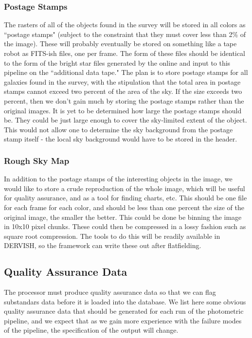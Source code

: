 \subsubsection{Postage Stamps}

The rasters of all of the objects found in the survey will be stored in 
all colors as ``postage stamps" (subject to the constraint that they
must cover less than 2\% of the image).  These will probably eventually be 
stored on something like a tape robot as FITS-ish files, one per frame.  
The form of these files should be identical to the form of the bright 
star files generated by the online and input to this pipeline on 
the ``additional data tape."  The plan is to
store postage stamps for all galaxies found in the survey, with the stipulation
that the total area in postage stamps cannot exceed two percent of the area
of the sky.  If the size exceeds two percent, then we don't gain much by
storing the postage stamps rather than the original images.  It is yet to
be determined how large the postage stamps should be.  They could be just
large enough to cover the sky-limited extent of the object.  This would not
allow one to determine the sky background from the postage stamp itself -
the local sky background would have to be stored in the header.

\subsubsection{Rough Sky Map}

In addition to the postage stamps of the interesting objects in the image,
we would like to store a crude reproduction of the whole image, which will
be useful for quality assurance, and as a tool for finding charts, etc.
This should be one file for each frame for each color, and should be less
than one percent the size of the original image, the smaller the better.
This could be done be binning the image in 10x10 pixel chunks.  These could
then be compressed in a lossy fashion such as square root compression.
The tools to do this will be readily available in DERVISH, so the framework
can write these out after flatfielding.

\subsection{Quality Assurance Data}

The processor must produce quality assurance data so that we can flag
substandars data before it is loaded into the database.  We list here some
obvious quality assurance data that should be generated for each run of
the photometric pipeline, and we expect that as we gain more experience with
the failure modes of the pipeline, the specification of the output will
change.

